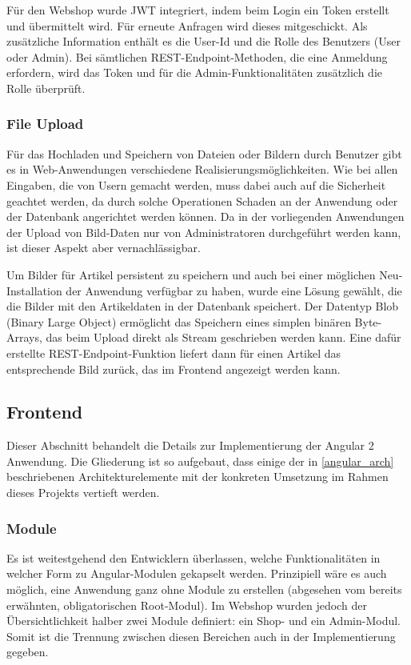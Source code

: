 Für den Webshop wurde \acs{JWT} integriert, indem beim Login ein Token erstellt und übermittelt wird. Für erneute Anfragen wird dieses mitgeschickt. Als zusätzliche Information enthält es die User-Id und die Rolle des Benutzers (User oder Admin).
Bei sämtlichen REST-Endpoint-Methoden, die eine Anmeldung erfordern, wird das Token und für die Admin-Funktionalitäten zusätzlich die Rolle überprüft.

\subsubsection{File Upload}
Für das Hochladen und Speichern von Dateien oder Bildern durch Benutzer gibt es in Web-Anwendungen verschiedene Realisierungsmöglichkeiten.
Wie bei allen Eingaben, die von Usern gemacht werden, muss dabei auch auf die Sicherheit geachtet werden, da durch solche Operationen Schaden an der Anwendung oder der Datenbank angerichtet werden können.
Da in der vorliegenden Anwendungen der Upload von Bild-Daten nur von Administratoren durchgeführt werden kann, ist dieser Aspekt aber vernachlässigbar.

Um Bilder für Artikel persistent zu speichern und auch bei einer möglichen Neu-Installation der Anwendung verfügbar zu haben, wurde eine Lösung gewählt, die die Bilder mit den Artikeldaten in der Datenbank speichert.
Der Datentyp \acs{Blob} (Binary Large Object) ermöglicht das Speichern eines simplen binären Byte-Arrays, das beim Upload direkt als Stream geschrieben werden kann.
Eine dafür erstellte REST-Endpoint-Funktion liefert dann für einen Artikel das entsprechende Bild zurück, das im Frontend angezeigt werden kann.

\subsection{Frontend}
Dieser Abschnitt behandelt die Details zur Implementierung der Angular 2 Anwendung. Die Gliederung ist so aufgebaut, dass einige der in \cref{angular_arch} beschriebenen Architekturelemente mit der konkreten Umsetzung im Rahmen dieses Projekts vertieft werden.

\subsubsection{Module}
Es ist weitestgehend den Entwicklern überlassen, welche Funktionalitäten in welcher Form zu Angular-Modulen gekapselt werden. Prinzipiell wäre es auch möglich, eine Anwendung ganz ohne Module zu erstellen (abgesehen vom bereits erwähnten, obligatorischen Root-Modul). Im Webshop wurden jedoch der Übersichtlichkeit halber zwei Module definiert: ein Shop- und ein Admin-Modul. Somit ist die Trennung zwischen diesen Bereichen auch in der Implementierung gegeben.

